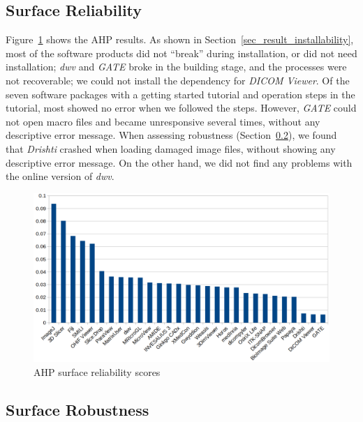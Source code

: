 \documentclass[final, 3p, times, authoryear]{elsarticle}
\begin{document}

\subsection{Surface Reliability} \label{sec_result_reliability}

Figure~\ref{fg_reliability_scores} shows the AHP results.  As shown in
Section~\ref{sec_result_installability}, most of the software products did not
``break'' during installation, or did not need installation; \textit{dwv} and
\textit{GATE} broke in the building stage, and the processes were not
recoverable; we could not install the dependency for \textit{DICOM Viewer}. Of
the seven software packages with a getting started tutorial and operation steps
in the tutorial, most showed no error when we followed the steps. However,
\textit{GATE} could not open macro files and became unresponsive several times,
without any descriptive error message. When assessing robustness
(Section~\ref{sec_result_robustness}), we found that \textit{Drishti} crashed
when loading damaged image files, without showing any descriptive error message.
On the other hand, we did not find any problems with the online version of
\textit{dwv}.

\begin{figure}[!ht]
\includegraphics[scale=0.38]{figures/reliability_scores.png}
\caption{AHP surface reliability scores}
\label{fg_reliability_scores}
\end{figure}

\subsection{Surface Robustness} \label{sec_result_robustness}
\end{document}
